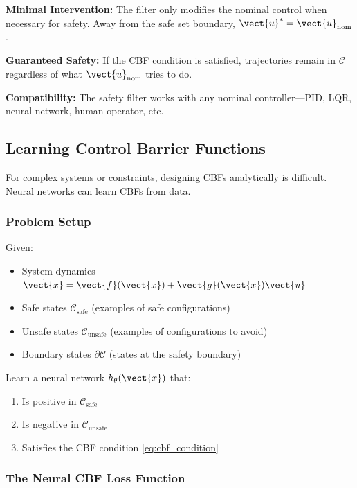 \textbf{Minimal Intervention:} The filter only modifies the nominal control when necessary for safety. Away from the safe set boundary, $\vect{u}^* = \vect{u}_{\text{nom}}$.

\textbf{Guaranteed Safety:} If the CBF condition is satisfied, trajectories remain in $\mathcal{C}$ regardless of what $\vect{u}_{\text{nom}}$ tries to do.

\textbf{Compatibility:} The safety filter works with any nominal controller---PID, LQR, neural network, human operator, etc.

\subsection{Learning Control Barrier Functions}

For complex systems or constraints, designing CBFs analytically is difficult. Neural networks can learn CBFs from data.

\subsubsection{Problem Setup}

Given:
\begin{itemize}
    \item System dynamics $\dot{\vect{x}} = \vect{f}(\vect{x}) + \vect{g}(\vect{x})\vect{u}$
    \item Safe states $\mathcal{C}_{\text{safe}}$ (examples of safe configurations)
    \item Unsafe states $\mathcal{C}_{\text{unsafe}}$ (examples of configurations to avoid)
    \item Boundary states $\partial \mathcal{C}$ (states at the safety boundary)
\end{itemize}

Learn a neural network $h_\theta(\vect{x})$ that:
\begin{enumerate}
    \item Is positive in $\mathcal{C}_{\text{safe}}$
    \item Is negative in $\mathcal{C}_{\text{unsafe}}$
    \item Satisfies the CBF condition \eqref{eq:cbf_condition}
\end{enumerate}

\subsubsection{The Neural CBF Loss Function}


